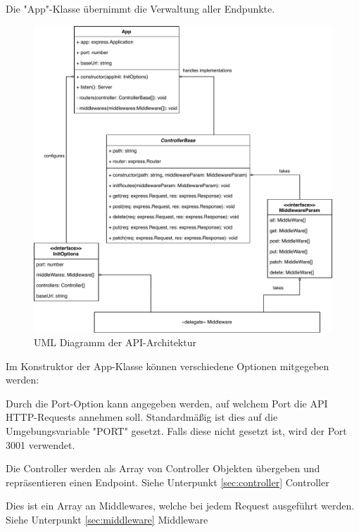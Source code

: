 \label{sec:app}

Die "App"-Klasse übernimmt die Verwaltung aller Endpunkte.  

\begin{figure}[H]
    \centering
    \includegraphics[width=\textwidth]{media/APITemplate/apiArchitecture.svg.pdf}
    \caption{UML Diagramm der API-Architektur}
    \label{fig:apiUML}
\end{figure}

\pagebreak

Im Konstruktor der App-Klasse können verschiedene Optionen mitgegeben werden:


Durch die Port-Option kann angegeben werden, auf welchem Port die API HTTP-Requests annehmen soll. Standardmäßig ist dies auf die Umgebungsvariable "PORT" gesetzt. Falls diese nicht gesetzt ist, wird der Port 3001 verwendet.


Die Controller werden als Array von Controller Objekten übergeben und repräsentieren einen Endpoint. Siehe Unterpunkt \ref{sec:controller} Controller


Dies ist ein Array an Middlewares, welche bei jedem Request ausgeführt werden. Siehe Unterpunkt \ref{sec:middleware} Middleware

